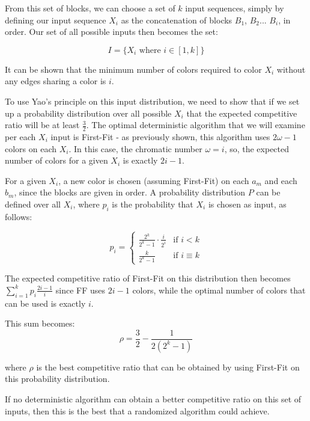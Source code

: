 From this set of blocks, we can choose a set of $k$ input sequences, simply by defining our input sequence $X_i$ as the concatenation of blocks $B_1$, $B_2$... $B_i$, in order. Our set of all possible inputs then becomes the set: 

\[I = \{X_i \text{ where } i \in [1,k]\}\]

It can be shown that the minimum number of colors required to color $X_i$ without any edges sharing a color is $i$.

To use Yao's principle on this input distribution, we need to show that if we set up a probability distribution over all possible $X_i$ that the expected competitive ratio will be at least $\frac{3}{2}$. The optimal deterministic algorithm that we will examine per each $X_i$ input is First-Fit - as previously shown, this algorithm uses $2\omega-1$ colors on each $X_i$. In this case, the chromatic number $\omega=i$, so, the expected number of colors for a given $X_i$ is exactly $2i-1$.

For a given $X_i$, a new color is chosen (assuming First-Fit) on each $a_m$ and each $b_m$, since the blocks are given in order. A probability distribution $P$ can be defined over all $X_i$, where $p_i$ is the probability that $X_i$ is chosen as input, as follows:

\[p_i = \begin{cases} \frac{2^k}{2^k-1}\cdot\frac{i}{2^i} &\mbox{if } i < k \\
\frac{k}{2^k-1} & \mbox{if } i \equiv k 
 \end{cases}\]

The expected competitive ratio of First-Fit on this distribution then becomes $\sum_{i=1}^k p_i\frac{2i-1}{i}$ since FF uses $2i-1$ colors, while the optimal number of colors that can be used is exactly $i$.

This sum becomes:
\begin{equation*}
\rho = \frac{3}{2} - \frac{1}{2(2^k-1)}
\end{equation*}

where $\rho$ is the best competitive ratio that can be obtained by using First-Fit on this probability distribution. 

If no deterministic algorithm can obtain a better competitive ratio on this set of inputs, then this is the best that a randomized algorithm could achieve.
